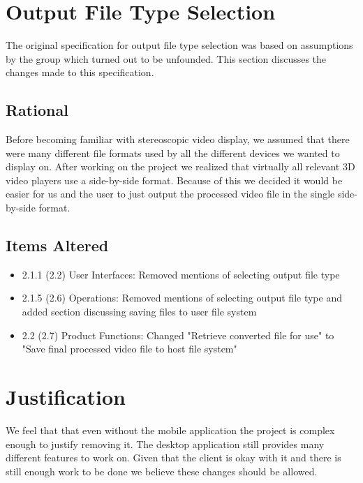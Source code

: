 \documentclass[10pt,letterpaper,onecolumn]{article}
\begin{document}
\section{Output File Type Selection}
The original specification for output file type selection was based on assumptions by the group which turned out to be unfounded.
This section discusses the changes made to this specification.
\subsection{Rational}
Before becoming familiar with stereoscopic video display, we assumed that there were many different file formats used by all the different devices we wanted to display on.
After working on the project we realized that virtually all relevant 3D video players use a side-by-side format.
Because of this we decided it would be easier for us and the user to just output the processed video file in the single side-by-side format.
\subsection{Items Altered}
\begin{itemize}
  \item 2.1.1 (2.2) User Interfaces: Removed mentions of selecting output file type
  \item 2.1.5 (2.6) Operations: Removed mentions of selecting output file type and added section discussing saving files to user file system
  \item 2.2 (2.7) Product Functions: Changed "Retrieve converted file for use" to "Save final processed video file to host file system"
\end{itemize}

\section{Justification}
We feel that that even without the mobile application the project is complex enough to justify removing it.
The desktop application still provides many different features to work on.
Given that the client is okay with it and there is still enough work to be done we believe these changes should be allowed.
\end{document}

